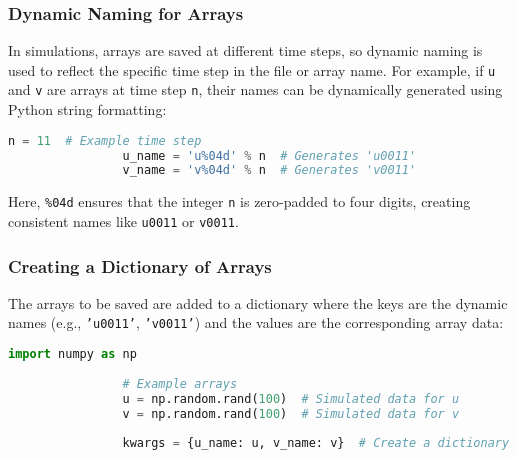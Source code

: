 \documentclass{article}
\begin{document}
			\subsubsection{Dynamic Naming for Arrays}
			
			In simulations, arrays are saved at different time steps, so dynamic naming is used to reflect the specific time step in the file or array name. For example, if \texttt{u} and \texttt{v} are arrays at time step \texttt{n}, their names can be dynamically generated using Python string formatting:
			\begin{lstlisting}[language=Python]
				n = 11  # Example time step
				u_name = 'u%04d' % n  # Generates 'u0011'
				v_name = 'v%04d' % n  # Generates 'v0011'
			\end{lstlisting}
			Here, \texttt{\%04d} ensures that the integer \texttt{n} is zero-padded to four digits, creating consistent names like \texttt{u0011} or \texttt{v0011}.
			
			\subsubsection{Creating a Dictionary of Arrays}
			
			The arrays to be saved are added to a dictionary where the keys are the dynamic names (e.g., \texttt{'u0011'}, \texttt{'v0011'}) and the values are the corresponding array data:
			\begin{lstlisting}[language=Python]
				import numpy as np
				
				# Example arrays
				u = np.random.rand(100)  # Simulated data for u
				v = np.random.rand(100)  # Simulated data for v
				
				kwargs = {u_name: u, v_name: v}  # Create a dictionary with names and arrays
			\end{lstlisting}
			
\end{document}
